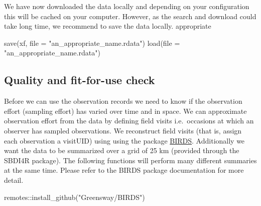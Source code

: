 \documentclass[
  10pt,
]{article}
\newenvironment{Shaded}{\begin{snugshade}}{\end{snugshade}}
\newcommand{\AttributeTok}[1]{\textcolor[rgb]{0.77,0.63,0.00}{#1}}
\newcommand{\FunctionTok}[1]{\textcolor[rgb]{0.00,0.00,0.00}{#1}}
\newcommand{\NormalTok}[1]{#1}
\newcommand{\SpecialCharTok}[1]{\textcolor[rgb]{0.00,0.00,0.00}{#1}}
\newcommand{\StringTok}[1]{\textcolor[rgb]{0.31,0.60,0.02}{#1}}
\begin{document}
We have now downloaded the data locally and depending on your
configuration this will be cached on your computer. However, as the
search and download could take long time, we recommend to save the data
locally. appropriate

\begin{Shaded}
\begin{Highlighting}[]
\FunctionTok{save}\NormalTok{(xf, }\AttributeTok{file =} \StringTok{"an\_appropriate\_name.rdata"}\NormalTok{)}
\FunctionTok{load}\NormalTok{(}\AttributeTok{file =} \StringTok{"an\_appropriate\_name.rdata"}\NormalTok{)}
\end{Highlighting}
\end{Shaded}

\hypertarget{quality-and-fit-for-use-check}{%
\subsection{Quality and fit-for-use check}\label{quality-and-fit-for-use-check}}

Before we can use the observation records we need to know if the
observation effort (sampling effort) has varied over time and in space.
We can approximate observation effort from the data by defining field
visits i.e.~occasions at which an observer has sampled observations. We
reconstruct field visits (that is, assign each observation a visitUID)
using using the package \href{https://greensway.github.io/BIRDS/}{BIRDS}.
Additionally we want the data to be summarized over a grid of 25 km
(provided through the SBDI4R package). The following functions will
perform many different summaries at the same time. Please refer to the
BIRDS package documentation for more detail.

\begin{Shaded}
\begin{Highlighting}[]
\NormalTok{remotes}\SpecialCharTok{::}\FunctionTok{install\_github}\NormalTok{(}\StringTok{"Greensway/BIRDS"}\NormalTok{)}
\end{Highlighting}
\end{Shaded}
\end{document}

